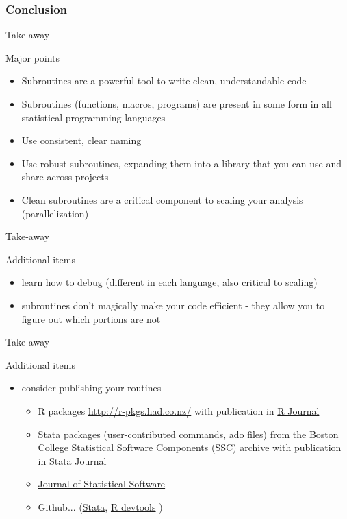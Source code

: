 \documentclass[xcolor=table,compress]{beamer}
\begin{document}
\subsubsection{Conclusion}

\begin{frame}{Take-away}
\begin{block}{Major points}
\begin{itemize}
\item Subroutines are a powerful tool to write clean, understandable code
\item Subroutines (functions, macros, programs) are present in some form in all statistical programming languages
\item Use consistent, clear naming
\item Use robust subroutines, expanding them into a library that you can use and share across projects
\item Clean subroutines are a critical component to scaling your analysis (parallelization)
\end{itemize}
\end{block}
\end{frame}


\begin{frame}{Take-away}
\begin{block}{Additional items}
\begin{itemize}
\item learn how to debug (different in each language, also critical to scaling)
\item subroutines don't magically make your code efficient - they allow you to figure out which 
portions are not

\end{itemize}
\end{block}
\end{frame}

\begin{frame}{Take-away}
\begin{block}{Additional items}
\begin{itemize}
\item consider publishing your routines 
\begin{itemize}
\item R packages \url{http://r-pkgs.had.co.nz/} with publication in 
\href{http://journal.r-project.org/}{R Journal}
\item Stata packages (user-contributed commands, ado files) from the 
\href{https://ideas.repec.org/s/boc/bocode.html}{Boston College Statistical Software 
Components (SSC) archive} with publication in \href{http://www.stata-journal.com/}{Stata 
Journal}
\item \href{http://www.jstatsoft.org/}{Journal of Statistical Software}
\item Github... (\href{https://github.com/coderigo/stata-git}{Stata}, 
\href{https://github.com/hadley/devtools}{R devtools} )
\end{itemize}
\end{itemize}
\end{block}
\end{frame}
\end{document}
